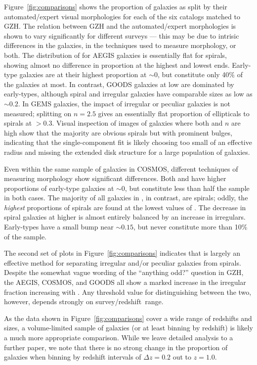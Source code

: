 \documentclass[twocolumn]{aastex6}
\begin{document}
Figure~\ref{fig:comparisons} shows the proportion of galaxies as split by their automated/expert visual morphologies for each of the six catalogs matched to GZH. The relation between GZH and the automated/expert morphologies is shown to vary significantly for different surveys --- this may be due to intrisic differences in the galaxies, in the techniques used to measure morphology, or both. The distribution of \pbest{} for AEGIS galaxies is essentially flat for spirals, showing almost no difference in proportion at the highest and lowest ends. Early-type galaxies are at their highest proportion at \pbest$\sim0$, but constitute only 40\% of the galaxies at most. In contrast, GOODS galaxies at low \pbest{} are dominated by early-types, although spiral and irregular galaxies have comparable sizes as low as \pbest$\sim0.2$. In GEMS galaxies, the impact of irregular or peculiar galaxies is not measured; splitting on $n=2.5$ gives an essentially flat proportion of ellipticals to spirals at \pbest$>0.3$. Visual inspection of images of galaxies where both \pbest{} and $n$ are high show that the majority are obvious spirals but with prominent bulges, indicating that the single-component \sersic{} fit is likely choosing too small of an effective radius and missing the extended disk structure for a large population of galaxies. 

Even within the same sample of galaxies in COSMOS, different techniques of measuring morphology show significant differences. Both \citet{cas07} and \citet{tas11} have higher proportions of early-type galaxies at \pbest$\sim0$, but constitute less than half the sample in both cases. The majority of all galaxies in \citet{sca07}, in contrast, are spirals; oddly, the \emph{highest} proportions of spirals are found at the lowest values of \pbest. The decrease in spiral galaxies at higher \pbest{} is almost entirely balanced by an increase in irregulars. Early-types have a small bump near \pbest$\sim0.15$, but never constitute more than 10\% of the sample. 

The second set of plots in Figure~\ref{fig:comparisons} indicates that \podd{} is largely an effective method for separating irregular and/or peculiar galaxies from spirals. Despite the somewhat vague wording of the ``anything odd?'' question in GZH, the AEGIS, COSMOS, and GOODS all show a marked increase in the irregular fraction increasing with \podd. Any threshold value for distinguishing between the two, however, depends strongly on survey/redshift~range. 

As the data shown in Figure~\ref{fig:comparisons} cover a wide range of redshifts and sizes, a volume-limited sample of galaxies (or at least binning by redshift) is likely a much more appropriate comparison. While we leave detailed analysis to a further paper, we note that there is no strong change in the proportion of galaxies when binning by redshift intervals of $\Delta z=0.2$ out to $z=1.0$. 
\end{document}
